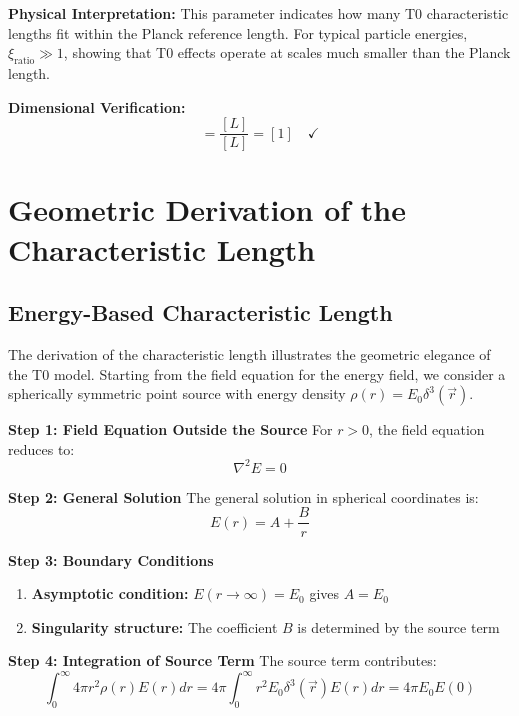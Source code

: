 \documentclass[12pt,a4paper]{report}
\newcommand{\xirat}{\xi_{\text{ratio}}}   %
\begin{document}
	\textbf{Physical Interpretation:} This parameter indicates how many T0 characteristic lengths fit within the Planck reference length. For typical particle energies, $\xirat \gg 1$, showing that T0 effects operate at scales much smaller than the Planck length.
	
	\textbf{Dimensional Verification:}
	\begin{equation}
		[\xi] = \frac{[L]}{[L]} = [1] \quad \checkmark
	\end{equation}
	
	\section{Geometric Derivation of the Characteristic Length}\label{sec:geometric_derivation}
	
	\subsection{Energy-Based Characteristic Length}\label{subsec:energy_based_length}
	
	The derivation of the characteristic length illustrates the geometric elegance of the T0 model. Starting from the field equation for the energy field, we consider a spherically symmetric point source with energy density $\rho(r) = E_0 \delta^3(\vec{r})$.
	
	\textbf{Step 1: Field Equation Outside the Source}
	For $r > 0$, the field equation reduces to:
	\begin{equation}
		\nabla^2 E = 0
		\label{eq:laplace_outside}
	\end{equation}
	
	\textbf{Step 2: General Solution}
	The general solution in spherical coordinates is:
	\begin{equation}
		E(r) = A + \frac{B}{r}
		\label{eq:general_solution}
	\end{equation}
	
	\textbf{Step 3: Boundary Conditions}
	\begin{enumerate}
		\item \textbf{Asymptotic condition:} $E(r \to \infty) = E_0$ gives $A = E_0$
		\item \textbf{Singularity structure:} The coefficient $B$ is determined by the source term
	\end{enumerate}
	
	\textbf{Step 4: Integration of Source Term}
	The source term contributes:
	\begin{equation}
		\int_0^{\infty} 4\pi r^2 \rho(r) E(r) dr = 4\pi \int_0^{\infty} r^2 E_0 \delta^3(\vec{r}) E(r) dr = 4\pi E_0 E(0)
	\end{equation}
	
\end{document}
